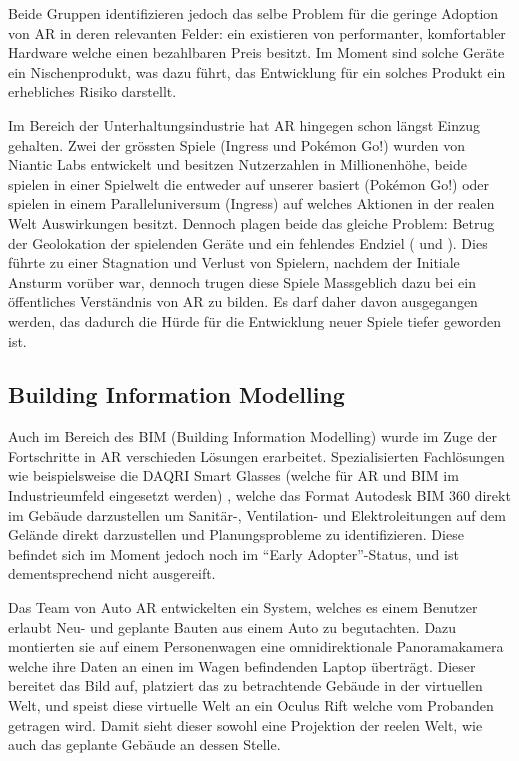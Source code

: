 \documentclass[a4paper]{scrreprt}
\begin{document}
Beide Gruppen identifizieren jedoch das selbe Problem für die geringe Adoption von AR in deren relevanten Felder: ein existieren von performanter, komfortabler Hardware welche einen bezahlbaren Preis besitzt. Im Moment sind solche Geräte ein Nischenprodukt, was dazu führt, das Entwicklung für ein solches Produkt ein erhebliches Risiko darstellt.

Im Bereich der Unterhaltungsindustrie hat AR hingegen schon längst Einzug gehalten. Zwei der grössten Spiele (Ingress und Pokémon Go!) wurden von Niantic Labs entwickelt und besitzen Nutzerzahlen in Millionenhöhe, beide spielen in einer Spielwelt die entweder auf unserer basiert (Pokémon Go!) oder spielen in einem Paralleluniversum (Ingress) auf welches Aktionen in der realen Welt Auswirkungen besitzt. Dennoch plagen beide das gleiche Problem: Betrug der Geolokation der spielenden Geräte und ein fehlendes Endziel (\cite{MRRX2015} und \cite{KamelBoulos2017}). Dies führte zu einer Stagnation und Verlust von Spielern, nachdem der Initiale Ansturm vorüber war, dennoch trugen diese Spiele Massgeblich dazu bei ein öffentliches Verständnis von AR zu bilden. Es darf daher davon ausgegangen werden, das dadurch die Hürde für die Entwicklung neuer Spiele tiefer geworden ist.

\subsection{Building Information Modelling}

Auch im Bereich des BIM (Building Information Modelling) wurde im Zuge der Fortschritte in AR verschieden Lösungen erarbeitet. Spezialisierten Fachlösungen wie beispielsweise die DAQRI Smart Glasses (welche für AR und BIM im Industrieumfeld eingesetzt werden) \parencite{DAQRI2018}, welche das Format Autodesk BIM 360 direkt im Gebäude darzustellen um Sanitär-, Ventilation- und Elektroleitungen auf dem Gelände direkt darzustellen und Planungsprobleme zu identifizieren. Diese befindet sich im Moment jedoch noch im \textquotedblleft Early Adopter\textquotedblright-Status, und ist dementsprechend nicht ausgereift.

Das Team von Auto AR \parencite{Opperman2015} entwickelten ein System, welches es einem Benutzer erlaubt Neu- und geplante Bauten aus einem Auto zu begutachten. Dazu montierten sie auf einem Personenwagen eine omnidirektionale Panoramakamera welche ihre Daten an einen im Wagen befindenden Laptop überträgt. Dieser bereitet das Bild auf, platziert das zu betrachtende Gebäude in der virtuellen Welt, und speist diese virtuelle Welt an ein Oculus Rift welche vom Probanden getragen wird. Damit sieht dieser sowohl eine Projektion der reelen Welt, wie auch das geplante Gebäude an dessen Stelle.
\end{document}
